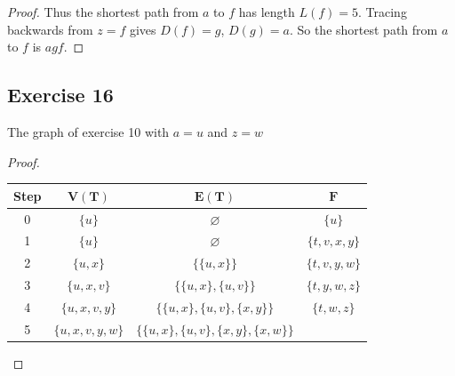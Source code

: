 \documentclass[14pt]{extarticle}
\newcommand{\es}{\varnothing}
\newcommand{\cy}{\color{cyan}}
\begin{document}
\begin{proof}
    Thus the shortest path from \(a\) to \(f\) has length \(L(f) = 5\). Tracing backwards from \(z = f\) gives \(D(f) = g\),
    \(D(g) = a\). So the shortest path from \(a\) to \(f\) is \(agf\).
\end{proof}

\subsection{Exercise 16}
The graph of exercise 10 with \(a = u\) and \(z = w\)

\begin{proof}
    \begin{center}
        \begin{tabular}{|c|c|c|c|}
            \hline
            {\bf \cy Step} & {\cy \(\bm{V(T)}\)} & {\cy \(\bm{E(T)}\)}                        & {\cy \(\bm{F}\)} \\
            \hline
            0              & \(\{u\}\)           & \(\es\)                                    & \(\{u\}\)        \\
            1              & \(\{u\}\)           & \(\es\)                                    & \(\{t,v,x,y\}\)  \\
            2              & \(\{u,x\}\)         & \(\{\{u,x\}\}\)                            & \(\{t,v,y,w\}\)  \\
            3              & \(\{u,x,v\}\)       & \(\{\{u,x\}, \{u,v\}\}\)                   & \(\{t,y,w,z\}\)  \\
            4              & \(\{u,x,v,y\}\)     & \(\{\{u,x\}, \{u,v\}, \{x,y\}\}\)          & \(\{t,w,z\}\)    \\
            5              & \(\{u,x,v,y,w\}\)   & \(\{\{u,x\}, \{u,v\}, \{x,y\}, \{x,w\}\}\) &                  \\
            \hline
        \end{tabular}


\end{center}
\end{proof}
\end{document}

